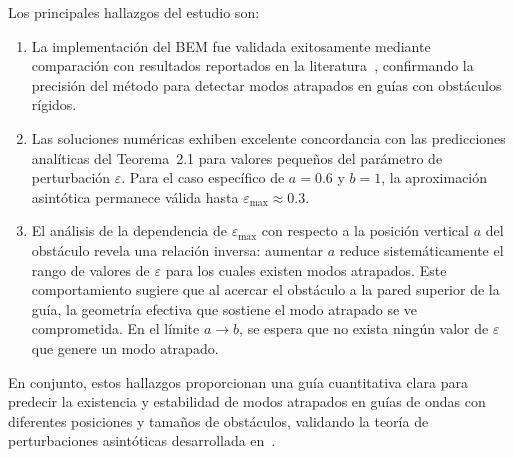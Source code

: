 \documentclass[11pt]{article}
\begin{document}
Los principales hallazgos del estudio son:

\begin{enumerate}
    \item La implementación del BEM fue validada exitosamente mediante comparación con resultados reportados en la literatura~\cite{articleMA1}, confirmando la precisión del método para detectar modos atrapados en guías con obstáculos rígidos.

    \item Las soluciones numéricas exhiben excelente concordancia con las predicciones analíticas del Teorema~2.1 para valores pequeños del parámetro de perturbación $\varepsilon$. Para el caso específico de $a=0.6$ y $b=1$, la aproximación asintótica permanece válida hasta $\varepsilon_{\max} \approx 0.3$.

    \item El análisis de la dependencia de $\varepsilon_{\max}$ con respecto a la posición vertical $a$ del obstáculo revela una relación inversa: aumentar $a$ reduce sistemáticamente el rango de valores de $\varepsilon$ para los cuales existen modos atrapados. Este comportamiento sugiere que al acercar el obstáculo a la pared superior de la guía, la geometría efectiva que sostiene el modo atrapado se ve comprometida. En el límite $a \to b$, se espera que no exista ningún valor de $\varepsilon$ que genere un modo atrapado.
\end{enumerate}

En conjunto, estos hallazgos proporcionan una guía cuantitativa clara para predecir la existencia y estabilidad de modos atrapados en guías de ondas con diferentes posiciones y tamaños de obstáculos, validando la teoría de perturbaciones asintóticas desarrollada en~\cite{Zhevandrov2025}.




\end{document}
